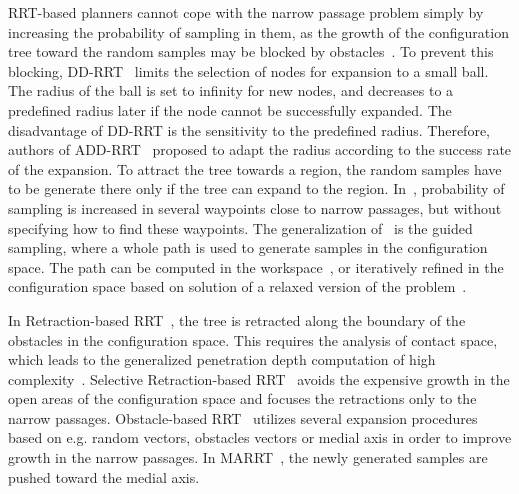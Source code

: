 \documentclass[usletter, 10pt, conference]{ieeeconf} %
\def\qrand{q_{rand}}
\def\qnear{q_{near}}
\begin{document}
RRT-based planners cannot cope with the narrow passage problem simply by increasing the probability of sampling in them, as the
growth of the configuration tree toward the random samples may be blocked by obstacles~\cite{vonasekphd}.
To prevent this blocking, DD-RRT~\cite{yershovaDDRRT} limits the selection of nodes for expansion to a small ball. 
The radius of the ball is set to infinity for new nodes, and decreases to a predefined radius later if the node cannot be successfully expanded.
The disadvantage of DD-RRT is the sensitivity to the predefined radius.
Therefore, authors of ADD-RRT~\cite{jailletADRRT} proposed to adapt the radius  according to the success rate of the expansion.
To attract the tree towards a region, the random samples have to be generate there only if the tree can expand to the region.
In~\cite{kardossRRTKK}, probability of sampling is increased in several waypoints close to narrow passages, but without specifying
how to find these waypoints.
The generalization of~\cite{kardossRRTKK} is the guided sampling, where a whole path is used
to generate samples in the configuration space.
The path can be computed in the workspace~\cite{vonasek2009rrt}, or iteratively refined in the configuration space based on solution of a relaxed version of the problem~\cite{bayazitIRC}.


In Retraction-based RRT~\cite{zhangRetraction}, the tree is retracted along the boundary of the obstacles in the configuration space.
This requires the analysis of contact space, which leads to the generalized penetration depth computation of high complexity~\cite{he2016efficient}. %
Selective Retraction-based RRT~\cite{lee2012srrrt} avoids the expensive growth in the open areas of the configuration space and focuses 
the retractions only to the narrow passages.
Obstacle-based RRT~\cite{amatoOBRRT} utilizes several expansion procedures based on e.g. random vectors, obstacles vectors or medial axis in order to improve growth in the narrow passages.
In MARRT~\cite{denny2014marrt}, the newly generated samples are pushed toward the medial axis.
\end{document}
